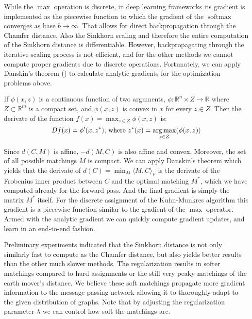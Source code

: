 While the $\max$ operation is discrete, in deep learning frameworks its gradient is implemented as the piecewise function to which the gradient of the $\operatorname{softmax}$ converges as base $b \to \infty$. That allows for direct backpropagation through the Chamfer distance. Also the Sinkhorn scaling and therefore the entire computation of the Sinkhorn distance is differentiable. However, backpropagating through the iterative scaling process is not efficient, and for the other methods we cannot compute proper gradients due to discrete operations. Fortunately, we can apply Danskin's theorem (\citealp{danskin1967}) to calculate analytic gradients for the optimization problems above.
\begin{theorem}
     If $\phi(x,z)$ is a continuous function of two arguments, $\phi: {\mathbb R}^n \times Z \rightarrow {\mathbb R}$ where $Z \subset {\mathbb R}^m$ is a compact set, and  $\phi(x,z)$ is convex in $x$ for every $z \in Z$.
     Then the derivate of the function $f(x) = \max_{z \in Z} \phi(x,z)$ is:
     \begin{equation}
          D f(x) = \phi'(x,z^*)  \text{, where } z^*(x) = \operatorname*{arg\,max}_{z \in Z}(\phi(x,z))
     \end{equation}
\end{theorem}
Since $d(C, M)$ is affine, $-d(M,C)$ is also affine and convex. Moreover, the set of all possible matchings $M$ is compact. We can apply Danskin's theorem which yields that the derivate of $d(C) = \min_M \langle M, C \rangle_\mathrm{F}$ is the derivate of the Frobenius inner product between $C$ and the optimal matching $M^*$, which we have computed already for the forward pass. And the final gradient is simply the matrix $M^*$ itself. For the discrete assignment of the Kuhn-Munkres algorithm this gradient is a piecewise function similar to the gradient of the $\max$ operator. Armed with the analytic gradient we can quickly compute gradient updates, and learn in an end-to-end fashion.

Preliminary experiments indicated that the Sinkhorn distance is not only similarly fast to compute as the Chamfer distance, but also yields better results than the other much slower methods. The regularization results in softer matchings compared to hard assignments or the still very peaky matchings of the earth mover's distance. We believe these soft matchings propagate more gradient information to the message passing network allowing it to thoroughly adapt to the given distribution of graphs. Note that by adjusting the regularization parameter $\lambda$ we can control how soft the matchings are.

